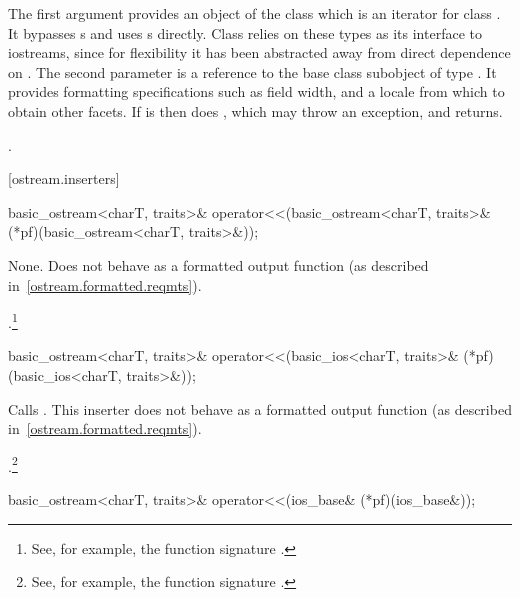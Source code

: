 \begin{itemdescr}
\pnum
The first argument provides an object of the
class which is an iterator for class .
It bypasses
s
and uses
s
directly.
Class
relies on these types as its
interface to iostreams, since for flexibility it has been abstracted
away from direct dependence on
.
The second parameter is a reference to the base class subobject of type
.
It provides formatting specifications such as field width, and
a locale from which to obtain other facets.
If
is
then does
,
which may throw an exception, and returns.

\pnum
\returns
{}.
\end{itemdescr}

[ostream.inserters]{}

%
\begin{itemdecl}
basic_ostream<charT, traits>&
  operator<<(basic_ostream<charT, traits>& (*pf)(basic_ostream<charT, traits>&));
\end{itemdecl}

\begin{itemdescr}
\pnum
\effects
None.
Does not behave as a formatted output function (as described
in~\ref{ostream.formatted.reqmts}).

\pnum
\returns
{}.\footnote{See, for example, the function signature
%
.}
\end{itemdescr}

%
\begin{itemdecl}
basic_ostream<charT, traits>&
  operator<<(basic_ios<charT, traits>& (*pf)(basic_ios<charT, traits>&));
\end{itemdecl}

\begin{itemdescr}
\pnum
\effects
Calls
.
This inserter does not
behave as a formatted output function (as described in~\ref{ostream.formatted.reqmts}).

\pnum
\returns
{}.\footnote{See, for example, the function signature
%
.}
\end{itemdescr}

%
\begin{itemdecl}
basic_ostream<charT, traits>& operator<<(ios_base& (*pf)(ios_base&));
\end{itemdecl}

